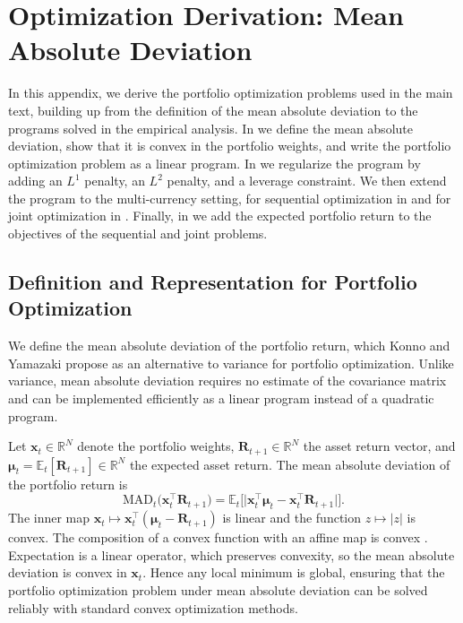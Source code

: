 \chapter{Optimization Derivation: Mean Absolute Deviation} \label{app:mad_derivation}

In this appendix, we derive the portfolio optimization problems used in the main text, building up from the definition
of the mean absolute deviation to the programs solved in the empirical analysis. In  we
define the mean absolute deviation, show that it is convex in the portfolio weights, and write the portfolio
optimization problem as a linear program. In  we regularize the program by adding an
$L^1$ penalty, an $L^2$ penalty, and a leverage constraint. We then extend the program to the multi-currency setting,
for sequential optimization in  and for joint optimization in . Finally, in
 we add the expected portfolio return to the objectives of the sequential and joint problems.

\section{Definition and Representation for Portfolio Optimization} \label{app:mad_representation}

We define the mean absolute deviation of the portfolio return, which Konno and Yamazaki \cite{KonnoYamazaki1991}
propose as an alternative to variance for portfolio optimization. Unlike variance, mean absolute deviation requires no
estimate of the covariance matrix and can be implemented efficiently as a linear program instead of a quadratic program. 

Let $\bm{x}_t \in \mathbb{R}^N$ denote the portfolio weights, $\bm{R}_{t+1} \in \mathbb{R}^N$ the asset return vector,
and $\bm{\mu}_t = \mathbb{E}_t[\bm{R}_{t+1}] \in \mathbb{R}^N$ the expected asset return. The mean absolute deviation
of the portfolio return is
\begin{equation} \label{eq:mad_def}
    \text{MAD}_t\bigl( \bm{x}_t^\top \bm{R}_{t+1} \bigr)
    = \mathbb{E}_t\bigl[ \lvert \bm{x}_t^\top \bm{\mu}_t - \bm{x}_t^\top \bm{R}_{t+1} \rvert \bigr].
\end{equation}
The inner map $\bm{x}_t \mapsto \bm{x}_t^\top (\bm{\mu}_t - \bm{R}_{t+1})$ is linear and the function
$z \mapsto \lvert z \rvert$ is convex. The composition of a convex function with an affine map is convex
\cite[Section~3.2.2]{boyd2004convex}. Expectation is a linear operator, which preserves convexity, so the mean absolute
deviation is convex in $\bm{x}_t$. Hence any local minimum is global, ensuring that the portfolio optimization problem
under mean absolute deviation can be solved reliably with standard convex optimization methods.

